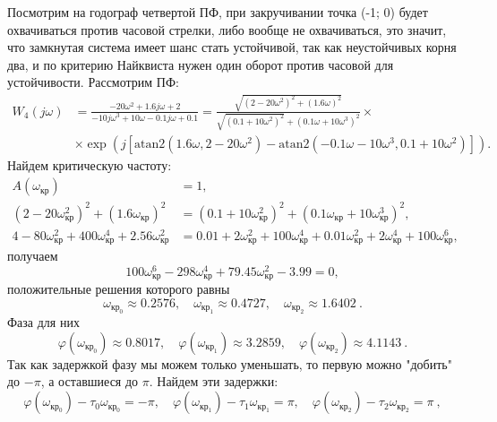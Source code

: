 Посмотрим на годограф четвертой ПФ, при закручивании точка (-1; 0) будет охвачиваться
против часовой стрелки, либо вообще не охвачиваться, это значит, что
замкнутая система имеет шанс стать устойчивой, так как неустойчивых корня два,
и по критерию Найквиста нужен один оборот против часовой для устойчивости. Рассмотрим ПФ:
\begin{equation*}
\begin{split}
    W_4(j\omega)&=\frac{-20\omega^2+1.6j\omega+2}{-10j\omega^3+10\omega-0.1j\omega+0.1}
    =\frac{\sqrt{(2-20\omega^2)^2+(1.6\omega)^2}}{\sqrt{(0.1+10\omega^2)^2}+(0.1\omega+10\omega^3)^2}\times\\
    &\times\exp \left( j \left[ \text{atan2}(1.6\omega,2-20\omega^2) - \text{atan2}(-0.1\omega-10\omega^3,0.1+10\omega^2) \right] \right).
\end{split}
\end{equation*}
Найдем критическую частоту:
\begin{equation*}
    \begin{split}
        A(\omega_\text{кр})&=1,\\
        (2-20\omega_\text{кр}^2)^2+(1.6\omega_\text{кр})^2&=(0.1+10\omega_\text{кр}^2)^2+(0.1\omega_\text{кр}+10\omega_\text{кр}^3)^2,\\
        4-80\omega_\text{кр}^2+400\omega_\text{кр}^4+2.56\omega_\text{кр}^2&=0.01+2\omega_\text{кр}^2+100\omega_\text{кр}^4+0.01\omega_\text{кр}^2+2\omega_\text{кр}^4+100\omega_\text{кр}^6,
    \end{split}
\end{equation*}
получаем
\begin{equation*}
    100\omega_\text{кр}^6-298\omega_\text{кр}^4+79.45\omega_\text{кр}^2-3.99=0,
\end{equation*}
положительные решения которого равны
\begin{equation*}
    \omega_{\text{кр}_0}\approx0.2576,\quad\omega_{\text{кр}_1}\approx0.4727,\quad\omega_{\text{кр}_2}\approx1.6402\ .
\end{equation*}
Фаза для них
\begin{equation*}
    \varphi(\omega_{\text{кр}_0})\approx0.8017,\quad\varphi(\omega_{\text{кр}_1})\approx3.2859,\quad\varphi(\omega_{\text{кр}_2})\approx4.1143\ .
\end{equation*}
Так как задержкой фазу мы можем только уменьшать, то первую можно "добить" до $-\pi$,
а оставшиеся до $\pi$. Найдем эти задержки:
\begin{equation*}
    \varphi(\omega_{\text{кр}_0})-\tau_0\omega_{\text{кр}_0}=-\pi,\quad
    \varphi(\omega_{\text{кр}_1})-\tau_1\omega_{\text{кр}_1}=\pi,\quad
    \varphi(\omega_{\text{кр}_2})-\tau_2\omega_{\text{кр}_2}=\pi\ ,
\end{equation*}
